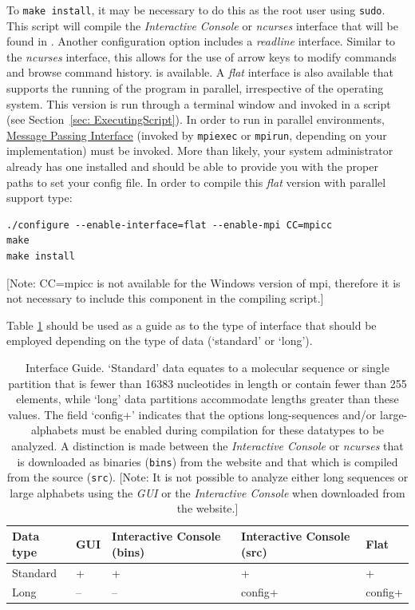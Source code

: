 To \texttt{make install}, it may be necessary to do this as the
root user using \texttt{sudo}.  This script will compile the
\emph{Interactive Console} or \emph{ncurses} interface that will
be found in .  Another configuration
option includes a \emph{readline} interface.  Similar to the
\emph{ncurses} interface, this allows for the use of arrow keys to
modify commands and browse command history.  %
is available.  A \emph{flat} interface is also available that
supports the running of the program in parallel, irrespective of
the operating system. This version is run through a terminal window
and invoked in a script (see Section~\ref{sec: ExecutingScript}).
In order to run \poy in parallel environments,
\href{http://www-unix.mcs.anl.gov/mpi/}{Message Passing Interface}
(invoked by \texttt{mpiexec} or \texttt{mpirun}, depending on your
implementation) must be invoked.  More than likely, your system
administrator already has one installed and should be able to provide
you with the proper paths to set your config file. In order to
compile this \emph{flat} version with parallel support type:

\begin{verbatim}
./configure --enable-interface=flat --enable-mpi CC=mpicc
make 
make install 
\end{verbatim} 

[Note: CC=mpicc is not available
for the Windows version of mpi, therefore it is not necessary to
include this component in the compiling script.]

Table \ref{InterfaceGuide} should be used as a guide as to the type of 
interface that should be employed depending on the type of data (`standard' 
or `long').

\begin{table}[th!]
\small
\caption{Interface Guide. `Standard' data equates to a molecular sequence 
or single partition that is fewer than 16383 nucleotides in length or contain 
fewer than 255 elements, while `long' data partitions accommodate lengths 
greater than these values. The field `config+' indicates that the options 
long-sequences and/or large-alphabets must be enabled during compilation 
for these datatypes to be analyzed. A distinction is made between the 
\emph{Interactive Console} or \emph{ncurses} that is downloaded as binaries 
(\texttt{bins}) from the website and that which is compiled from the source 
(\texttt{src}). [Note: It is not possible to analyze either long sequences or
large alphabets using the \emph{GUI} or the \emph{Interactive Console} 
when downloaded from the \poy website.]}
\label{InterfaceGuide} 
\begin{center}
\renewcommand{\arraystretch}{1.5}
\begin{tabular}{p{2.0cm}  p{0.75cm}  p{3.0cm}  p{3.0cm}  p{1.0cm}} 
\hline
Data type & GUI & Interactive Console (bins) & Interactive Console (src) & Flat \\
\hline
Standard & + & + & + & + \\
Long & -- & -- & config+ & config+\\
\hline
\end{tabular}
\end{center}
\end{table}

